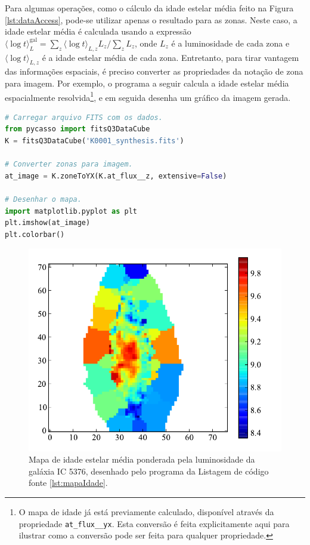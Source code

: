 Para algumas operações, como o cálculo da idade estelar média feito na Figura
\ref{lst:dataAccess}, pode-se utilizar apenas o resultado para as zonas. Neste
caso, a idade estelar média é calculada usando a expressão $\langle \log t
\rangle^{\mathrm{gal}}_L = \sum_z \langle \log t \rangle_{L,z} L_z / \sum_z
L_z$, onde $L_z$ é a luminosidade de cada zona e $\langle \log t \rangle_{L,z}$
é a idade estelar média de cada zona. Entretanto, para tirar vantagem das
informações espaciais, é preciso converter as propriedades da notação de zona
para imagem.
Por exemplo, o programa a seguir calcula a idade estelar média espacialmente
resolvida\footnote{O mapa de idade já está previamente calculado, disponível
através da propriedade \texttt{at\_flux\_\_yx}. Esta conversão é feita
explicitamente aqui para ilustrar como a conversão pode ser feita para qualquer
propriedade.}, e em seguida desenha um gráfico da imagem gerada.

\begin{lstlisting}[language=Python, caption={Programa para desenhar o mapa de
idade estelar média ponderada pela luminosidade. O gráfico resultante é mostrado
na Figura \ref{fig:mapaIdade}.}, label={lst:mapaIdade}]
# Carregar arquivo FITS com os dados.
from pycasso import fitsQ3DataCube
K = fitsQ3DataCube('K0001_synthesis.fits')

# Converter zonas para imagem.
at_image = K.zoneToYX(K.at_flux__z, extensive=False)

# Desenhar o mapa.
import matplotlib.pyplot as plt
plt.imshow(at_image)
plt.colorbar()
\end{lstlisting}

\begin{figure}
	\includegraphics{figuras/mapa-idade}
	\caption[Mapa da idade estelar média da galáxia IC 5376] {Mapa de idade estelar
	média ponderada pela luminosidade da galáxia IC 5376, desenhado pelo programa
	da Listagem de código fonte \ref{lst:mapaIdade}.}
	\label{fig:mapaIdade}
\end{figure}

